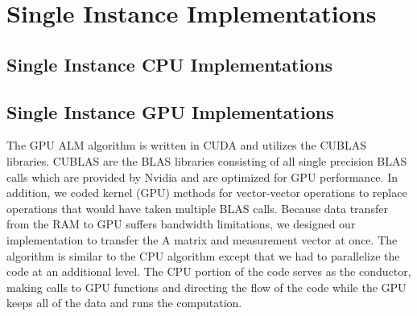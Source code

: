 \documentclass[10pt,twocolumn,letterpaper]{article}
\begin{document}


\section{Single Instance Implementations}

\subsection{Single Instance CPU Implementations}

\subsection{Single Instance GPU Implementations}
The GPU ALM algorithm is written in CUDA and utilizes the CUBLAS libraries.
CUBLAS are the BLAS libraries consisting of all single precision BLAS calls
which are provided by Nvidia and are optimized for GPU performance. In
addition, we coded kernel (GPU) methods for vector-vector operations to replace
operations that would have taken multiple BLAS calls. Because data transfer from the RAM to GPU suffers bandwidth limitations, we designed our implementation to transfer the A matrix and measurement vector at once.  The algorithm is similar
to the CPU algorithm except that we had to parallelize the code at an
additional level. The CPU portion of the code serves as the conductor, making
calls to GPU functions and directing the flow of the code while the GPU keeps all of the data and runs the computation.
\end{document}
